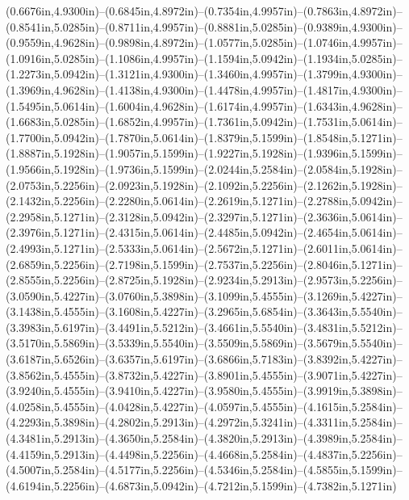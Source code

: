 (0.6676in,4.9300in)--(0.6845in,4.8972in)--(0.7354in,4.9957in)--(0.7863in,4.8972in)--(0.8541in,5.0285in)--(0.8711in,4.9957in)--(0.8881in,5.0285in)--(0.9389in,4.9300in)--(0.9559in,4.9628in)--(0.9898in,4.8972in)--(1.0577in,5.0285in)--(1.0746in,4.9957in)--(1.0916in,5.0285in)--(1.1086in,4.9957in)--(1.1594in,5.0942in)--(1.1934in,5.0285in)--(1.2273in,5.0942in)--(1.3121in,4.9300in)--(1.3460in,4.9957in)--(1.3799in,4.9300in)--(1.3969in,4.9628in)--(1.4138in,4.9300in)--(1.4478in,4.9957in)--(1.4817in,4.9300in)--(1.5495in,5.0614in)--(1.6004in,4.9628in)--(1.6174in,4.9957in)--(1.6343in,4.9628in)--(1.6683in,5.0285in)--(1.6852in,4.9957in)--(1.7361in,5.0942in)--(1.7531in,5.0614in)--(1.7700in,5.0942in)--(1.7870in,5.0614in)--(1.8379in,5.1599in)--(1.8548in,5.1271in)--(1.8887in,5.1928in)--(1.9057in,5.1599in)--(1.9227in,5.1928in)--(1.9396in,5.1599in)--(1.9566in,5.1928in)--(1.9736in,5.1599in)--(2.0244in,5.2584in)--(2.0584in,5.1928in)--(2.0753in,5.2256in)--(2.0923in,5.1928in)--(2.1092in,5.2256in)--(2.1262in,5.1928in)--(2.1432in,5.2256in)--(2.2280in,5.0614in)--(2.2619in,5.1271in)--(2.2788in,5.0942in)--(2.2958in,5.1271in)--(2.3128in,5.0942in)--(2.3297in,5.1271in)--(2.3636in,5.0614in)--(2.3976in,5.1271in)--(2.4315in,5.0614in)--(2.4485in,5.0942in)--(2.4654in,5.0614in)--(2.4993in,5.1271in)--(2.5333in,5.0614in)--(2.5672in,5.1271in)--(2.6011in,5.0614in)--(2.6859in,5.2256in)--(2.7198in,5.1599in)--(2.7537in,5.2256in)--(2.8046in,5.1271in)--(2.8555in,5.2256in)--(2.8725in,5.1928in)--(2.9234in,5.2913in)--(2.9573in,5.2256in)--(3.0590in,5.4227in)--(3.0760in,5.3898in)--(3.1099in,5.4555in)--(3.1269in,5.4227in)--(3.1438in,5.4555in)--(3.1608in,5.4227in)--(3.2965in,5.6854in)--(3.3643in,5.5540in)--(3.3983in,5.6197in)--(3.4491in,5.5212in)--(3.4661in,5.5540in)--(3.4831in,5.5212in)--(3.5170in,5.5869in)--(3.5339in,5.5540in)--(3.5509in,5.5869in)--(3.5679in,5.5540in)--(3.6187in,5.6526in)--(3.6357in,5.6197in)--(3.6866in,5.7183in)--(3.8392in,5.4227in)--(3.8562in,5.4555in)--(3.8732in,5.4227in)--(3.8901in,5.4555in)--(3.9071in,5.4227in)--(3.9240in,5.4555in)--(3.9410in,5.4227in)--(3.9580in,5.4555in)--(3.9919in,5.3898in)--(4.0258in,5.4555in)--(4.0428in,5.4227in)--(4.0597in,5.4555in)--(4.1615in,5.2584in)--(4.2293in,5.3898in)--(4.2802in,5.2913in)--(4.2972in,5.3241in)--(4.3311in,5.2584in)--(4.3481in,5.2913in)--(4.3650in,5.2584in)--(4.3820in,5.2913in)--(4.3989in,5.2584in)--(4.4159in,5.2913in)--(4.4498in,5.2256in)--(4.4668in,5.2584in)--(4.4837in,5.2256in)--(4.5007in,5.2584in)--(4.5177in,5.2256in)--(4.5346in,5.2584in)--(4.5855in,5.1599in)--(4.6194in,5.2256in)--(4.6873in,5.0942in)--(4.7212in,5.1599in)--(4.7382in,5.1271in)
